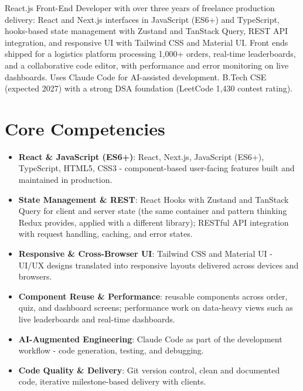 \documentclass[11pt,a4paper,sans]{moderncv}
\begin{document}
\makecvtitle


\vspace{6pt}
\small{React.js Front-End Developer with over three years of freelance production delivery: React and Next.js interfaces in JavaScript (ES6+) and TypeScript, hooks-based state management with Zustand and TanStack Query, REST API integration, and responsive UI with Tailwind CSS and Material UI. Front ends shipped for a logistics platform processing 1,000+ orders, real-time leaderboards, and a collaborative code editor, with performance and error monitoring on live dashboards. Uses Claude Code for AI-assisted development. B.Tech CSE (expected 2027) with a strong DSA foundation (LeetCode 1,430 contest rating).}


\section{Core Competencies}
\vspace{1pt}
\begin{itemize}

\item \textbf{React \& JavaScript (ES6+)}: React, Next.js, JavaScript (ES6+), TypeScript, HTML5, CSS3 - component-based user-facing features built and maintained in production.

\item \textbf{State Management \& REST}: React Hooks with Zustand and TanStack Query for client and server state (the same container and pattern thinking Redux provides, applied with a different library); RESTful API integration with request handling, caching, and error states.

\item \textbf{Responsive \& Cross-Browser UI}: Tailwind CSS and Material UI - UI/UX designs translated into responsive layouts delivered across devices and browsers.

\item \textbf{Component Reuse \& Performance}: reusable components across order, quiz, and dashboard screens; performance work on data-heavy views such as live leaderboards and real-time dashboards.

\item \textbf{AI-Augmented Engineering}: Claude Code as part of the development workflow - code generation, testing, and debugging.

\item \textbf{Code Quality \& Delivery}: Git version control, clean and documented code, iterative milestone-based delivery with clients.

\end{itemize}
\end{document}
